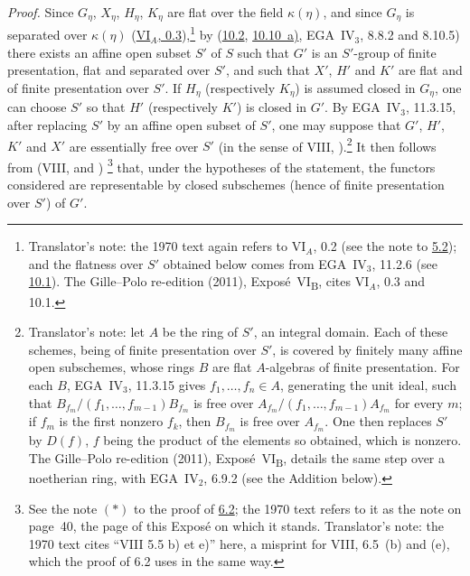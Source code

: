 \emph{Proof.}
Since \(G_\eta\), \(X_\eta\), \(H_\eta\), \(K_\eta\) are flat over the field \(\kappa(\eta)\), and since
\(G_\eta\) is separated over \(\kappa(\eta)\)
\textup{(\hyperref[sga3:VIA:0.3]{VI\(_A\), 0.3})},\footnote{Translator's note: the 1970 text again refers to
VI\(_A\), 0.2 (see the note to \hyperref[prop:sga3-VIB-5.2]{5.2}); and the flatness over \(S'\) obtained below
comes from EGA~IV\(_3\), 11.2.6 (see \hyperref[par:sga3-VIB-10.1]{10.1}). The Gille--Polo re-edition (2011),
Expos\'e~VI\textsubscript{B}, cites VI\(_A\), 0.3 and 10.1.} by \textup{(}\hyperref[lem:sga3-VIB-10.2]{10.2},
\hyperref[par:sga3-VIB-10.10-a]{10.10~a)}, EGA~IV\(_3\), 8.8.2 and 8.10.5\textup{)} there exists an affine open
subset \(S'\) of \(S\) such that \(G'\) is an \(S'\)-group of finite presentation, flat and separated over
\(S'\), and such that \(X'\), \(H'\) and \(K'\) are flat and of finite presentation over \(S'\). If
\(H_\eta\) \textup{(}respectively \(K_\eta\)\textup{)} is assumed closed in \(G_\eta\), one can choose \(S'\) so
that \(H'\) \textup{(}respectively \(K'\)\textup{)} is closed in \(G'\). By EGA~IV\(_3\), 11.3.15, after
replacing \(S'\) by an affine open subset of \(S'\), one may suppose that \(G'\), \(H'\), \(K'\) and \(X'\) are
essentially free over \(S'\) \textup{(}in the sense of VIII,
\textup{)}.\footnote{Translator's note: let \(A\) be the ring of
\(S'\), an integral domain. Each of these schemes, being of finite presentation over \(S'\), is covered by
finitely many affine open subschemes, whose rings \(B\) are flat \(A\)-algebras of finite presentation. For each
\(B\), EGA~IV\(_3\), 11.3.15 gives \(f_1,\ldots,f_n\in A\), generating the unit ideal, such that
\(B_{f_m}/(f_1,\ldots,f_{m-1})B_{f_m}\) is free over \(A_{f_m}/(f_1,\ldots,f_{m-1})A_{f_m}\) for every \(m\); if
\(f_m\) is the first nonzero \(f_k\), then \(B_{f_m}\) is free over \(A_{f_m}\). One then replaces \(S'\) by
\(D(f)\), \(f\) being the product of the elements so obtained, which is nonzero. The Gille--Polo re-edition
(2011), Expos\'e~VI\textsubscript{B}, details the same step over a noetherian ring, with EGA~IV\(_2\), 6.9.2 (see
the Addition below).} It then follows from \textup{(}VIII, 
and \textup{)}%
\begingroup
\renewcommand{\thefootnote}{\ensuremath{(\ast)}}%
\footnote[1]{\label{note:sga3-VIB-10.11-star}See the note \((\ast)\) to the proof of
\hyperref[note:sga3-VIB-6.2-star]{6.2}; the 1970 text refers to it as the note on page~40, the page of this Expos\'e
on which it stands. Translator's note: the 1970 text cites ``VIII 5.5 b) et e)'' here, a misprint for VIII, 6.5~(b)
and (e), which the proof of 6.2 uses in the same way.}%
\endgroup{} that, under the hypotheses of the statement, the functors considered are representable by closed
subschemes \textup{(}hence of finite presentation over \(S'\)\textup{)} of \(G'\).

